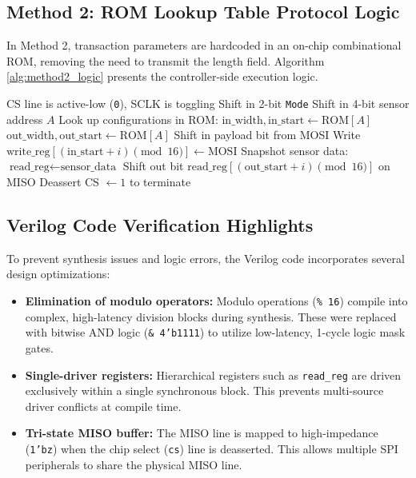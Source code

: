 \documentclass[conference]{IEEEtran}
\begin{document}
\subsection{Method 2: ROM Lookup Table Protocol Logic}
In Method 2, transaction parameters are hardcoded in an on-chip combinational ROM, removing the need to transmit the length field. Algorithm \ref{alg:method2_logic} presents the controller-side execution logic.

\begin{algorithm}[H]
\caption{Method 2 Controller Execution Logic}
\label{alg:method2_logic}
\begin{algorithmic}[1]
\REQUIRE CS line is active-low (\texttt{0}), SCLK is toggling
\STATE Shift in 2-bit \texttt{Mode}
\STATE Shift in 4-bit sensor address $A$
\STATE Look up configurations in ROM:
\STATE \quad $\text{in\_width}, \text{in\_start} \leftarrow \text{ROM}[A]$
\STATE \quad $\text{out\_width}, \text{out\_start} \leftarrow \text{ROM}[A]$
    \STATE Shift in payload bit from MOSI
    \STATE Write $\text{write\_reg}[(\text{in\_start} + i) \pmod{16}] \leftarrow \text{MOSI}$
  \ENDFOR
{}
  \STATE Snapshot sensor data: $\text{read\_reg} \leftarrow \text{sensor\_data}$
    \STATE Shift out bit $\text{read\_reg}[(\text{out\_start} + i) \pmod{16}]$ on MISO
  \ENDFOR
\ENDIF
\STATE Deassert CS $\leftarrow 1$ to terminate
\end{algorithmic}
\end{algorithm}

\subsection{Verilog Code Verification Highlights}
To prevent synthesis issues and logic errors, the Verilog code incorporates several design optimizations:
\begin{itemize}
    \item \textbf{Elimination of modulo operators:} Modulo operations (\texttt{\% 16}) compile into complex, high-latency division blocks during synthesis. These were replaced with bitwise AND logic (\texttt{\& 4'b1111}) to utilize low-latency, 1-cycle logic mask gates.
    \item \textbf{Single-driver registers:} Hierarchical registers such as \texttt{read\_reg} are driven exclusively within a single synchronous block. This prevents multi-source driver conflicts at compile time.
    \item \textbf{Tri-state MISO buffer:} The MISO line is mapped to high-impedance (\texttt{1'bz}) when the chip select (\texttt{cs}) line is deasserted. This allows multiple SPI peripherals to share the physical MISO line.
\end{itemize}
\end{document}
